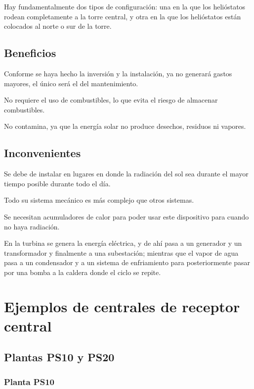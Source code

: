 Hay fundamentalmente dos tipos de configuración: una en la que los helióstatos rodean completamente a la torre central, y otra en la que los helióstatos están colocados al norte o sur de la torre.

\subsection{Beneficios}

Conforme se haya hecho la inversión y la instalación, ya no generará gastos mayores, el único será el del mantenimiento.

No requiere el uso de combustibles, lo que evita el riesgo de almacenar combustibles.

No contamina, ya que la energía solar no produce desechos, residuos ni vapores.

\subsection{Inconvenientes}

Se debe de instalar en lugares en donde la radiación del sol sea durante el mayor tiempo posible durante todo el día.

Todo su sistema mecánico es más complejo que otros sistemas.

Se necesitan acumuladores de calor para poder usar este dispositivo para cuando no haya radiación.

En la turbina se genera la energía eléctrica, y de ahí pasa a un generador y un transformador y finalmente a una subestación; mientras que el vapor de agua pasa a un condensador y a un sistema de enfriamiento para posteriormente pasar por una bomba a la caldera donde el ciclo se repite. \cite{IgualadaWebSite} \cite{SoliclimaWebSite} \cite{ClaudioWebSite}

\section{Ejemplos de centrales de receptor central}

\subsection{Plantas PS10 y PS20}

\subsubsection{Planta PS10}

